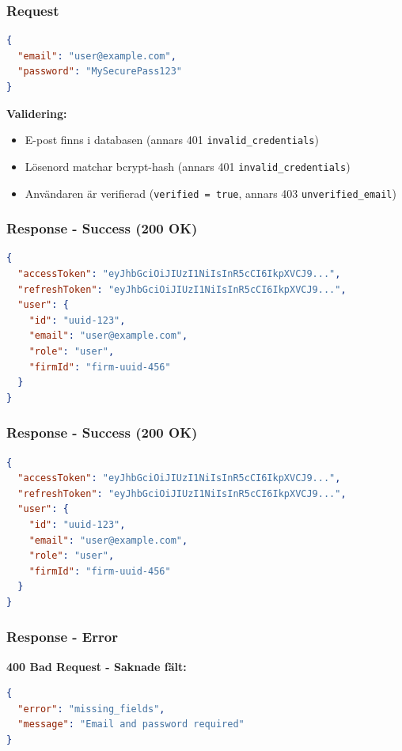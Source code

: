 \documentclass[12pt,a4paper]{article}
\begin{document}
\subsubsection{Request}
\begin{lstlisting}[language=json]
{
  "email": "user@example.com",
  "password": "MySecurePass123"
}
\end{lstlisting}

\textbf{Validering:}
\begin{itemize}[noitemsep]
  \item E-post finns i databasen (annars 401 \texttt{invalid\_credentials})
  \item Lösenord matchar bcrypt-hash (annars 401 \texttt{invalid\_credentials})
  \item Användaren är verifierad (\texttt{verified = true}, annars 403 \texttt{unverified\_email})
\end{itemize}

\subsubsection{Response - Success (200 OK)}
\begin{lstlisting}[language=json]
{
  "accessToken": "eyJhbGciOiJIUzI1NiIsInR5cCI6IkpXVCJ9...",
  "refreshToken": "eyJhbGciOiJIUzI1NiIsInR5cCI6IkpXVCJ9...",
  "user": {
    "id": "uuid-123",
    "email": "user@example.com",
    "role": "user",
    "firmId": "firm-uuid-456"
  }
}
\end{lstlisting}

\subsubsection{Response - Success (200 OK)}
\begin{lstlisting}[language=json]
{
  "accessToken": "eyJhbGciOiJIUzI1NiIsInR5cCI6IkpXVCJ9...",
  "refreshToken": "eyJhbGciOiJIUzI1NiIsInR5cCI6IkpXVCJ9...",
  "user": {
    "id": "uuid-123",
    "email": "user@example.com",
    "role": "user",
    "firmId": "firm-uuid-456"
  }
}
\end{lstlisting}

\subsubsection{Response - Error}
\textbf{400 Bad Request - Saknade fält:}
\begin{lstlisting}[language=json]
{
  "error": "missing_fields",
  "message": "Email and password required"
}
\end{lstlisting}
\end{document}

